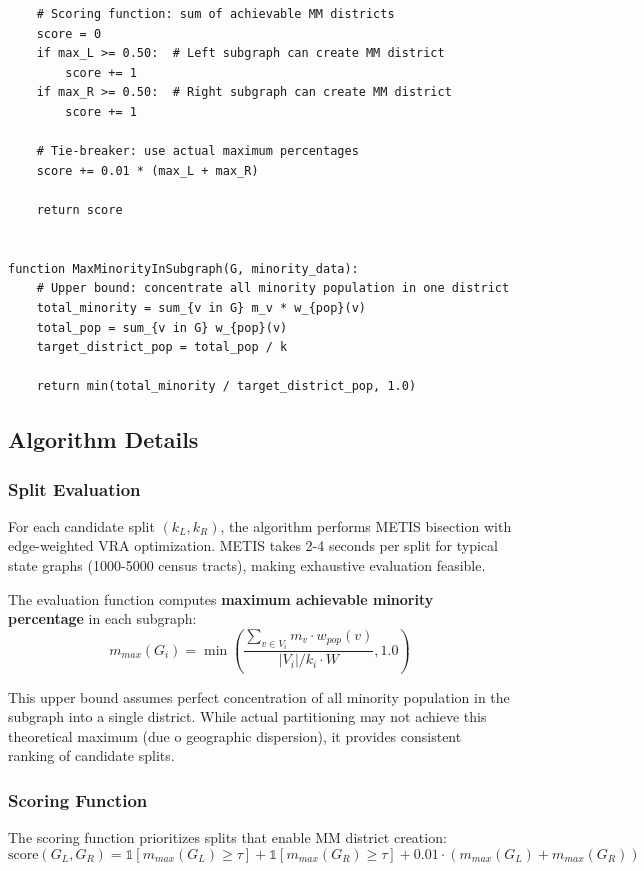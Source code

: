 \begin{verbatim}
    # Scoring function: sum of achievable MM districts
    score = 0
    if max_L >= 0.50:  # Left subgraph can create MM district
        score += 1
    if max_R >= 0.50:  # Right subgraph can create MM district
        score += 1

    # Tie-breaker: use actual maximum percentages
    score += 0.01 * (max_L + max_R)

    return score


function MaxMinorityInSubgraph(G, minority_data):
    # Upper bound: concentrate all minority population in one district
    total_minority = sum_{v in G} m_v * w_{pop}(v)
    total_pop = sum_{v in G} w_{pop}(v)
    target_district_pop = total_pop / k

    return min(total_minority / target_district_pop, 1.0)
\end{verbatim}

\subsection{Algorithm Details}

\subsubsection{Split Evaluation}

For each candidate split $(k_L, k_R)$, the algorithm performs METIS bisection with edge-weighted VRA optimization. METIS takes 2-4 seconds per split for typical state graphs (1000-5000 census tracts), making exhaustive evaluation feasible.

The evaluation function computes \textbf{maximum achievable minority percentage} in each subgraph:
\begin{equation}
m_{max}(G_i) = \min\left(\frac{\sum_{v \in V_i} m_v \cdot w_{pop}(v)}{|V_i| / k_i \cdot W}, 1.0\right)
\end{equation}

This upper bound assumes perfect concentration of all minority population in the subgraph into a single district. While actual partitioning may not achieve this theoretical maximum (due 	o geographic dispersion), it provides consistent ranking of candidate splits.

\subsubsection{Scoring Function}

The scoring function prioritizes splits that enable MM district creation:
\begin{equation}
\text{score}(G_L, G_R) = \mathbb{1}[m_{max}(G_L) \geq \tau] + \mathbb{1}[m_{max}(G_R) \geq \tau] + 0.01 \cdot (m_{max}(G_L) + m_{max}(G_R))
\end{equation}

